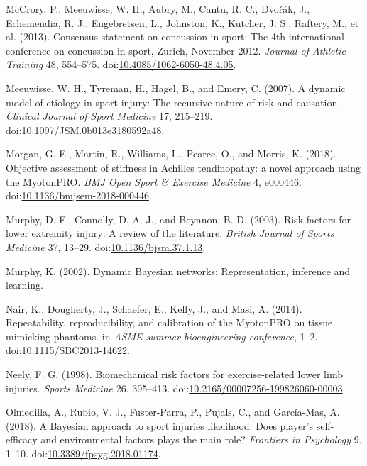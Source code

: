 \documentclass[
]{frontiersHLTH}
\newlength{\cslhangindent}
\newenvironment{cslreferences}%
  {\setlength{\parindent}{0pt}%
  \everypar{\setlength{\hangindent}{\cslhangindent}}\ignorespaces}%
  {\par}
\begin{document}
\begin{cslreferences}
\leavevmode\hypertarget{ref-McCrory2013}{}%
McCrory, P., Meeuwisse, W. H., Aubry, M., Cantu, R. C., Dvořák, J.,
Echemendia, R. J., Engebretsen, L., Johnston, K., Kutcher, J. S.,
Raftery, M., et al. (2013). Consensus statement on concussion in sport:
The 4th international conference on concussion in sport, Zurich,
November 2012. \emph{Journal of Athletic Training} 48, 554--575.
doi:\href{https://doi.org/10.4085/1062-6050-48.4.05}{10.4085/1062-6050-48.4.05}.

\leavevmode\hypertarget{ref-Meeuwisse2007}{}%
Meeuwisse, W. H., Tyreman, H., Hagel, B., and Emery, C. (2007). A
dynamic model of etiology in sport injury: The recursive nature of risk
and causation. \emph{Clinical Journal of Sport Medicine} 17, 215--219.
doi:\href{https://doi.org/10.1097/JSM.0b013e3180592a48}{10.1097/JSM.0b013e3180592a48}.

\leavevmode\hypertarget{ref-Morgan2018}{}%
Morgan, G. E., Martin, R., Williams, L., Pearce, O., and Morris, K.
(2018). Objective assessment of stiffness in Achilles tendinopathy: a
novel approach using the MyotonPRO. \emph{BMJ Open Sport \& Exercise
Medicine} 4, e000446.
doi:\href{https://doi.org/10.1136/bmjsem-2018-000446}{10.1136/bmjsem-2018-000446}.

\leavevmode\hypertarget{ref-Murphy2003}{}%
Murphy, D. F., Connolly, D. A. J., and Beynnon, B. D. (2003). Risk
factors for lower extremity injury: A review of the literature.
\emph{British Journal of Sports Medicine} 37, 13--29.
doi:\href{https://doi.org/10.1136/bjsm.37.1.13}{10.1136/bjsm.37.1.13}.

\leavevmode\hypertarget{ref-Murphy2002}{}%
Murphy, K. (2002). Dynamic Bayesian networks: Representation, inference
and learning.

\leavevmode\hypertarget{ref-Nair2014}{}%
Nair, K., Dougherty, J., Schaefer, E., Kelly, J., and Masi, A. (2014).
Repeatability, reproducibility, and calibration of the MyotonPRO on
tissue mimicking phantoms. in \emph{ASME summer bioengineering
conference}, 1--2.
doi:\href{https://doi.org/10.1115/SBC2013-14622}{10.1115/SBC2013-14622}.

\leavevmode\hypertarget{ref-Neely1998}{}%
Neely, F. G. (1998). Biomechanical risk factors for exercise-related
lower limb injuries. \emph{Sports Medicine} 26, 395--413.
doi:\href{https://doi.org/10.2165/00007256-199826060-00003}{10.2165/00007256-199826060-00003}.

\leavevmode\hypertarget{ref-Olmedilla2018}{}%
Olmedilla, A., Rubio, V. J., Fuster-Parra, P., Pujals, C., and
García-Mas, A. (2018). A Bayesian approach to sport injuries likelihood:
Does player's self-efficacy and environmental factors plays the main
role? \emph{Frontiers in Psychology} 9, 1--10.
doi:\href{https://doi.org/10.3389/fpsyg.2018.01174}{10.3389/fpsyg.2018.01174}.


\end{cslreferences}
\end{document}
